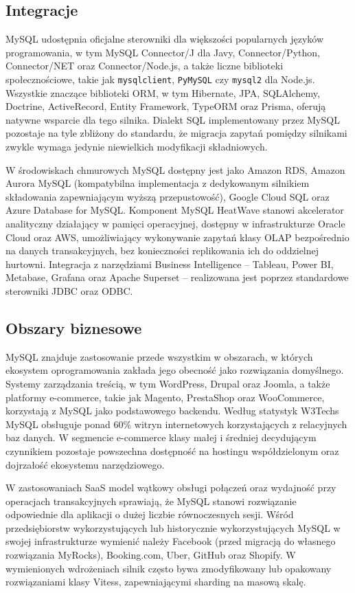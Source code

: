 \subsection{Integracje}

MySQL udostępnia oficjalne sterowniki dla większości popularnych języków
programowania, w tym MySQL Connector/J dla Javy, Connector/Python,
Connector/NET oraz Connector/Node.js, a także liczne biblioteki społecznościowe,
takie jak \texttt{mysqlclient}, \texttt{PyMySQL} czy \texttt{mysql2} dla Node.js.
Wszystkie znaczące biblioteki ORM, w tym Hibernate, JPA, SQLAlchemy, Doctrine,
ActiveRecord, Entity Framework, TypeORM oraz Prisma, oferują natywne wsparcie
dla tego silnika. Dialekt SQL implementowany przez MySQL pozostaje na tyle
zbliżony do standardu, że migracja zapytań pomiędzy silnikami zwykle wymaga
jedynie niewielkich modyfikacji składniowych.

W środowiskach chmurowych MySQL dostępny jest jako Amazon RDS, Amazon Aurora
MySQL (kompatybilna implementacja z dedykowanym silnikiem składowania
zapewniającym wyższą przepustowość), Google Cloud SQL oraz Azure Database
for MySQL. Komponent MySQL HeatWave stanowi akcelerator analityczny działający
w pamięci operacyjnej, dostępny w infrastrukturze Oracle Cloud oraz AWS,
umożliwiający wykonywanie zapytań klasy OLAP bezpośrednio na danych
transakcyjnych, bez konieczności replikowania ich do oddzielnej hurtowni.
Integracja z narzędziami Business Intelligence -- Tableau, Power BI, Metabase,
Grafana oraz Apache Superset -- realizowana jest poprzez standardowe
sterowniki JDBC oraz ODBC.

\subsection{Obszary biznesowe}

MySQL znajduje zastosowanie przede wszystkim w obszarach, w których ekosystem
oprogramowania zakłada jego obecność jako rozwiązania domyślnego. Systemy
zarządzania treścią, w tym WordPress, Drupal oraz Joomla, a także platformy
e-commerce, takie jak Magento, PrestaShop oraz WooCommerce, korzystają z MySQL
jako podstawowego backendu. Według statystyk W3Techs MySQL obsługuje ponad
60\% witryn internetowych korzystających z relacyjnych baz danych. W segmencie
e-commerce klasy małej i średniej decydującym czynnikiem pozostaje powszechna
dostępność na hostingu współdzielonym oraz dojrzałość ekosystemu narzędziowego.

W zastosowaniach SaaS model wątkowy obsługi połączeń oraz wydajność przy
operacjach transakcyjnych sprawiają, że MySQL stanowi rozwiązanie odpowiednie
dla aplikacji o dużej liczbie równoczesnych sesji. Wśród przedsiębiorstw
wykorzystujących lub historycznie wykorzystujących MySQL w swojej infrastrukturze
wymienić należy Facebook (przed migracją do własnego rozwiązania MyRocks),
Booking.com, Uber, GitHub oraz Shopify. W wymienionych wdrożeniach silnik
często bywa zmodyfikowany lub opakowany rozwiązaniami klasy Vitess, zapewniającymi
sharding na masową skalę.

